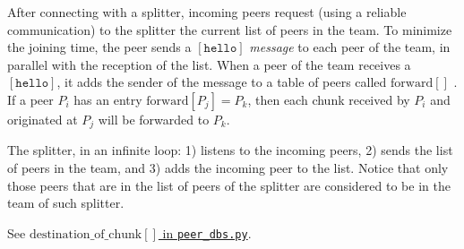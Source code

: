 
\label{sec:joining}

After connecting with a splitter, incoming peers request (using a
reliable communication) to the splitter the current list of peers in
the team. To minimize the joining time, the peer sends a
$[\mathtt{hello}]$ \emph{message} to each peer of the team, in
parallel with the reception of the list. When a peer of the team
receives a $[\mathtt{hello}]$, it adds the sender of the message to a
table of peers called $\text{forward}[]$ . If a peer $P_i$ has an entry
$\text{forward}[P_j]=P_k$, then each chunk received by $P_i$ and
originated at $P_j$ will be forwarded to $P_k$.


The splitter, in an infinite loop: 1) listens to the incoming peers,
2) sends the list of peers in the team, and 3) adds the incoming
peer to the list. Notice that only those peers that are in the list of
peers of the splitter are considered to be in the team of such
splitter.

\begin{comment}
\begin{figure*}
  \fig{1000}{10cm}{joining} \caption{Code related to team
    joining.\label{fig:joining}}
\end{figure*}

The new pseudo-code related to joining a team is describen in the
Fig.~\ref{fig:joining}.
\end{comment}

\begin{notex}
  See \href{https://github.com/P2PSP/simulator/blob/f0c73be1817e7d3b816cc61cd2c8e59b17f9a0e6/src/core/splitter_dbs.py#L296}{$\text{destination\_of\_chunk}[]$ in \texttt{peer\_dbs.py}}.
\end{notex}
